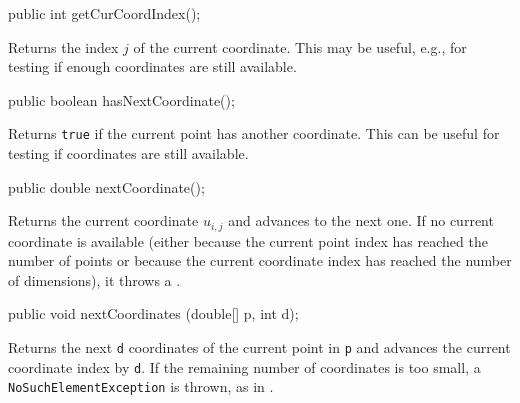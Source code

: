 \begin{code}

   public int getCurCoordIndex();
\end{code}
 \begin{tabb}
   Returns the index $j$ of the current coordinate.  This may be useful,
   e.g., for testing if enough coordinates are still available.
 \end{tabb}
\begin{htmlonly}
\end{htmlonly}
\begin{code}

   public boolean hasNextCoordinate();
\end{code}
 \begin{tabb}
   Returns \texttt{true} if the current point has another coordinate.
   This can be useful for testing if coordinates are still available.
 \end{tabb}
\begin{htmlonly}
\end{htmlonly}
\begin{code}

   public double nextCoordinate();
\end{code}
 \begin{tabb}
   Returns the current coordinate $u_{i,j}$ and advances to the next one.
   If no current coordinate is available (either because the current
   point index has reached the number of points or because the current
   coordinate index has reached the number of dimensions), it throws a 
   .
 \end{tabb}
\begin{htmlonly}
\end{htmlonly}
\begin{code}

   public void nextCoordinates (double[] p, int d);
\end{code}
 \begin{tabb}
   Returns the next \texttt{d} coordinates of the current point in \texttt{p}
   and advances the current coordinate index by \texttt{d}.
   If the remaining number of coordinates is too small, a
   \texttt{NoSuchElementException} is thrown, as in .
 \end{tabb}
